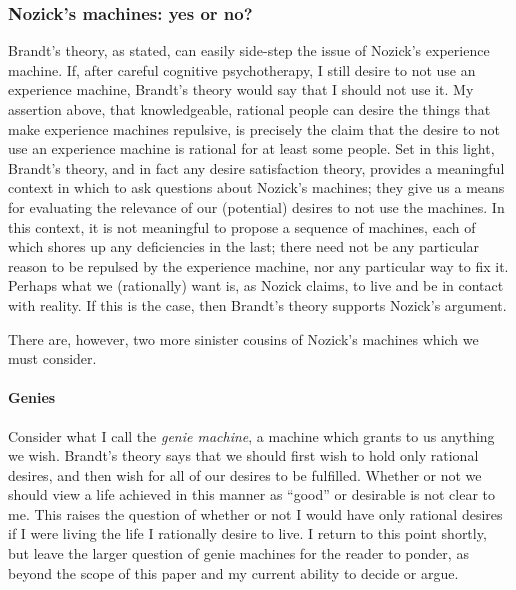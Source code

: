 \documentclass[letterpaper,11pt,twoside]{article}
\begin{document}
    \subsubsection*{Nozick's machines: yes or no?}
      Brandt's theory, as stated, can easily side-step the issue of Nozick's experience machine.  If, after careful cognitive psychotherapy, I still desire to not use an experience machine, Brandt's theory would say that I should not use it.  My assertion above, that knowledgeable, rational people can desire the things that make experience machines repulsive, is precisely the claim that the desire to not use an experience machine is rational for at least some people.  Set in this light, Brandt's theory, and in fact any desire satisfaction theory, provides a meaningful context in which to ask questions about Nozick's machines; they give us a means for evaluating the relevance of our (potential) desires to not use the machines.  In this context, it is not meaningful to propose a sequence of machines, each of which shores up any deficiencies in the last; there need not be any particular reason to be repulsed by the experience machine, nor any particular way to fix it.  Perhaps what we (rationally) want is, as Nozick claims, to live and be in contact with reality.  If this is the case, then Brandt's theory supports Nozick's argument.

      There are, however, two more sinister cousins of Nozick's machines which we must consider.

      \paragraph{Genies}
        Consider what I call the \emph{genie machine}, a machine which grants to us anything we wish.  Brandt's theory says that we should first wish to hold only rational desires, and then wish for all of our desires to be fulfilled.  Whether or not we should view a life achieved in this manner as ``good'' or desirable is not clear to me.  This raises the question of whether or not I would have only rational desires if I were living the life I rationally desire to live.  I return to this point shortly, but leave the larger question of genie machines for the reader to ponder, as beyond the scope of this paper and my current ability to decide or argue.
\end{document}
